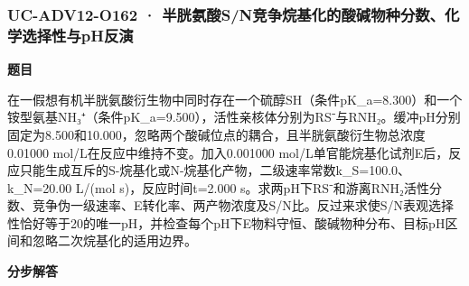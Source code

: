 \documentclass[UTF8,11pt,a4paper]{ctexart}
\begin{document}
\subsubsection*{UC-ADV12-O162 · 半胱氨酸S/N竞争烷基化的酸碱物种分数、化学选择性与pH反演}
\noindent\textbf{题目}\par
在一假想有机半胱氨酸衍生物中同时存在一个硫醇SH（条件pK\_a=8.300）和一个铵型氨基NH₃⁺（条件pK\_a=9.500），活性亲核体分别为RS⁻与RNH₂。缓冲pH分别固定为8.500和10.000，忽略两个酸碱位点的耦合，且半胱氨酸衍生物总浓度0.01000 mol/L在反应中维持不变。加入0.001000 mol/L单官能烷基化试剂E后，反应只能生成互斥的S-烷基化或N-烷基化产物，二级速率常数k\_S=100.0、k\_N=20.00 L/(mol s)，反应时间t=2.000 s。求两pH下RS⁻和游离RNH₂活性分数、竞争伪一级速率、E转化率、两产物浓度及S/N比。反过来求使S/N表观选择性恰好等于20的唯一pH，并检查每个pH下E物料守恒、酸碱物种分布、目标pH区间和忽略二次烷基化的适用边界。\par
\medskip\noindent\textbf{分步解答}
\end{document}
